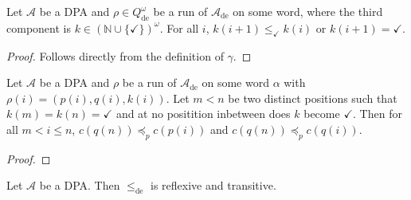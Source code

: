 \begin{lem}
	Let $\mathcal{A}$ be a DPA and $\rho \in Q_\text{de}^\omega$ be a run of $\mathcal{A}_\text{de}$ on some word, where the third component is $k \in (\mathbb{N} \cup \{\checkmark\})^\omega$. For all $i$, $k(i+1) \leq_\checkmark k(i)$ or $k(i+1) = \checkmark$.
\end{lem}

\begin{proof}
	Follows directly from the definition of $\gamma$.
\end{proof}

\begin{lem}
	Let $\mathcal{A}$ be a DPA and $\rho$ be a run of $\mathcal{A}_\text{de}$ on some word $\alpha$ with $\rho(i) = (p(i), q(i), k(i))$. Let $m < n$ be two distinct positions such that $k(m) = k(n) = \checkmark$ and at no positition inbetween does $k$ become $\checkmark$. Then for all $m < i \leq n$, $c(q(n)) \preceq_p c(p(i))$ and $c(q(n)) \preceq_p c(q(i))$.
\end{lem}

\begin{proof}
\end{proof}

\begin{lem}
	Let $\mathcal{A}$ be a DPA. Then $\leq_\text{de}$ is reflexive and transitive.
\end{lem}

